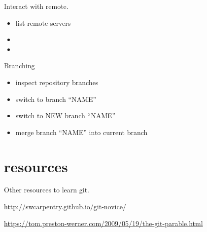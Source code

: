 \documentclass{training}
\begin{document}
Interact with remote.
\begin{itemize}
  \item {} list remote servers
  \item {}
  \item {}
\end{itemize}

Branching
\begin{itemize}
  \item {} inspect repository branches
  \item {} switch to branch ``NAME''
  \item {} switch to NEW branch ``NAME''
  \item {} merge branch ``NAME'' into current branch
\end{itemize}

\clearpage
\section{resources}

Other resources to learn git.

\url{http://swcarpentry.github.io/git-novice/}

\url{https://tom.preston-werner.com/2009/05/19/the-git-parable.html}
\end{document}
